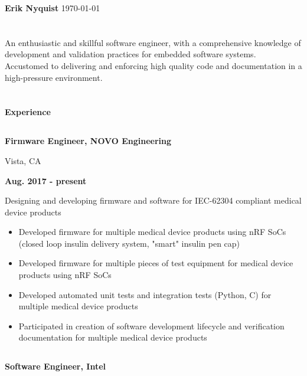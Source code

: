 \documentclass[6pt]{article}
\begin{document}
\begin{minipage}{35em}
%
%
{\Huge \bfseries Erik Nyquist}
{\hfill \today}
\section*{}

An enthusiastic and skillful software engineer, with a comprehensive knowledge of
development and validation practices for embedded software systems. Accustomed to
delivering and enforcing high quality code and documentation in a high-pressure
environment.

\section*{}
{\Large \bfseries Experience}

\dotfill
%
%
\subsection*{}
\begin{minipage}{20em}
{\bfseries Firmware Engineer, NOVO Engineering

Vista, CA}
\end{minipage}
\hfill
\begin{minipage}{10em}
{\bfseries Aug. 2017 - present}
\end{minipage}
\break
\break
Designing and developing firmware and software for IEC-62304 compliant medical
device products
\begin{itemize}
    \item Developed firmware for multiple medical device products using nRF SoCs
          (closed loop insulin delivery system, "smart" insulin pen cap)
    \item Developed firmware for multiple pieces of test equipment for medical
          device products using nRF SoCs
    \item Developed automated unit tests and integration tests (Python, C) for
          multiple medical device products
    \item Participated in creation of software development lifecycle and
          verification documentation for multiple medical device products
\end{itemize}
\dotfill

%
%
\subsection*{}
\begin{minipage}{20em}
{\bfseries Software Engineer, Intel

}
\end{minipage}
\end{minipage}
\end{document}

